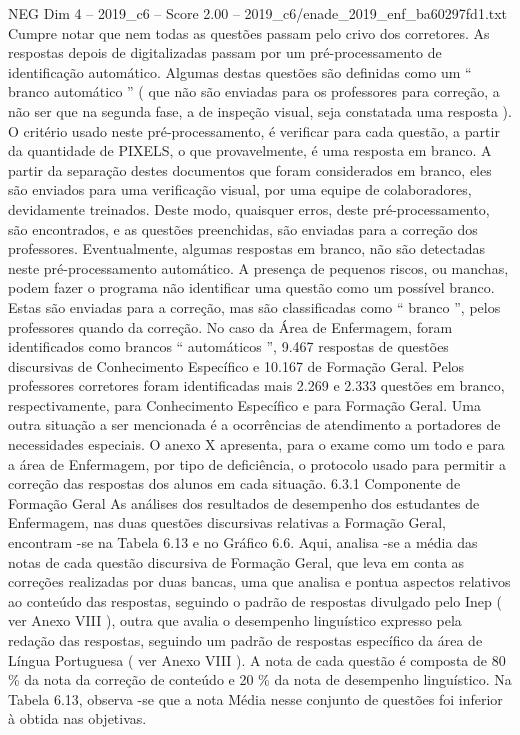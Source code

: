 \begin{textsample}{NEG Dim 4 – 2019\_c6 – Score 2.00 – 2019\_c6/enade\_2019\_enf\_ba60297fd1.txt}
Cumpre notar que nem todas as questões passam pelo crivo dos corretores.
As respostas depois de digitalizadas passam por um pré-processamento de identificação automático.
Algumas destas questões são definidas como um “ branco automático ” ( que não são enviadas para os professores para correção, a não ser que na segunda fase, a de inspeção visual, seja constatada uma resposta ).
O critério usado neste pré-processamento, é verificar para cada questão, a partir da quantidade de PIXELS, o que provavelmente, é uma resposta em branco.
A partir da separação destes documentos que foram considerados em branco, eles são enviados para uma verificação visual, por uma equipe de colaboradores, devidamente treinados.
Deste modo, quaisquer erros, deste pré-processamento, são encontrados, e as questões preenchidas, são enviadas para a correção dos professores.
Eventualmente, algumas respostas em branco, não são detectadas neste pré-processamento automático.
A presença de pequenos riscos, ou manchas, podem fazer o programa não identificar uma questão como um possível branco.
Estas são enviadas para a correção, mas são classificadas como “ branco ”, pelos professores quando da correção.
No caso da Área de Enfermagem, foram identificados como brancos “ automáticos ”, 9.467 respostas de questões discursivas de Conhecimento Específico e 10.167 de Formação Geral.
Pelos professores corretores foram identificadas mais 2.269 e 2.333 questões em branco, respectivamente, para Conhecimento Específico e para Formação Geral.
Uma outra situação a ser mencionada é a ocorrências de atendimento a portadores de necessidades especiais.
O anexo X apresenta, para o exame como um todo e para a área de Enfermagem, por tipo de deficiência, o protocolo usado para permitir a correção das respostas dos alunos em cada situação. 6.3.1 Componente de Formação Geral As análises dos resultados de desempenho dos estudantes de Enfermagem, nas duas questões discursivas relativas a Formação Geral, encontram -se na Tabela 6.13 e no Gráfico 6.6.
Aqui, analisa -se a média das notas de cada questão discursiva de Formação Geral, que leva em conta as correções realizadas por duas bancas, uma que analisa e pontua aspectos relativos ao conteúdo das respostas, seguindo o padrão de respostas divulgado pelo Inep ( ver Anexo VIII ), outra que avalia o desempenho linguístico expresso pela redação das respostas, seguindo um padrão de respostas específico da área de Língua Portuguesa ( ver Anexo VIII ).
A nota de cada questão é composta de 80 \% da nota da correção de conteúdo e 20 \% da nota de desempenho linguístico.
Na Tabela 6.13, observa -se que a nota Média nesse conjunto de questões foi inferior à obtida nas objetivas.

\end{textsample}
